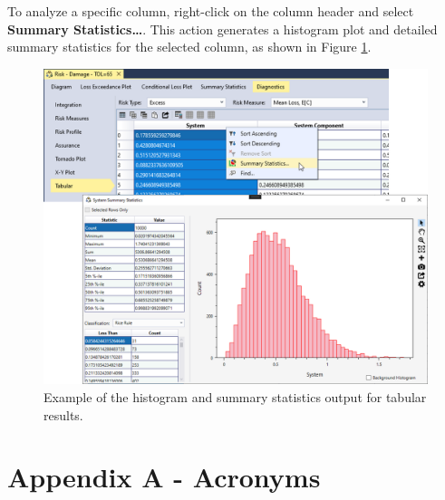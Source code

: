\documentclass[
]{book}
\newlength{\cslhangindent}
\newlength{\cslentryspacingunit} %
\newenvironment{CSLReferences}[2] %
 {%
  \setlength{\parindent}{0pt}
  \ifodd #1
  \let\oldpar\par
  \def\par{\hangindent=\cslhangindent\oldpar}
  \fi
  \setlength{\parskip}{#2\cslentryspacingunit}
 }%
 {}
\begin{document}
To analyze a specific column, right-click on the column header and select \textbf{Summary Statistics\ldots{}}. This action generates a histogram plot and detailed summary statistics for the selected column, as shown in Figure \ref{fig:figure-154}.

\begin{figure}

{\centering \includegraphics{images/figure154} 

}

\caption{Example of the histogram and summary statistics output for tabular results.}\label{fig:figure-154}
\end{figure}

\hypertarget{refs}{}
\begin{CSLReferences}{0}{0}
\end{CSLReferences}

\hypertarget{appendix-a---acronyms}{%
\chapter{Appendix A - Acronyms}\label{appendix-a---acronyms}}
\end{document}
